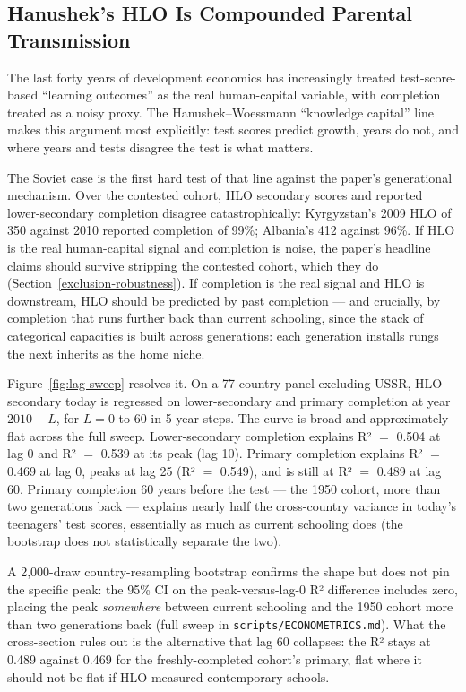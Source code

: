 \documentclass[12pt,letterpaper]{article}
\begin{document}
\subsection{Hanushek's HLO Is Compounded Parental Transmission}\label{hanushek-reconciliation}

The last forty years of development economics has increasingly
treated test-score-based ``learning outcomes'' as the real
human-capital variable, with completion treated as a noisy proxy.
The Hanushek--Woessmann ``knowledge capital'' line makes this
argument most explicitly: test scores predict growth, years do not,
and where years and tests disagree the test is what matters.

The Soviet case is the first hard test of that line against the
paper's generational mechanism. Over the contested cohort, HLO
secondary scores and reported lower-secondary completion disagree
catastrophically: Kyrgyzstan's 2009 HLO of 350 against 2010 reported
completion of 99\%; Albania's 412 against 96\%. If HLO is the real
human-capital signal and completion is noise, the paper's headline
claims should survive stripping the contested cohort, which they do
(Section~\ref{exclusion-robustness}). If completion is the real
signal and HLO is downstream, HLO should be predicted by past
completion --- and crucially, by completion that runs further back
than current schooling, since the stack of categorical capacities
is built across generations: each generation installs rungs the
next inherits as the home niche.

Figure~\ref{fig:lag-sweep} resolves it. On a 77-country panel
excluding USSR, HLO secondary today is regressed on lower-secondary
and primary completion at year $2010 - L$, for $L = 0$ to $60$ in
5-year steps. The curve is broad and approximately flat across the
full sweep. Lower-secondary completion explains R² $=$ 0.504 at lag
0 and R² $=$ 0.539 at its peak (lag 10). Primary completion explains
R² $=$ 0.469 at lag 0, peaks at lag 25 (R² $=$ 0.549), and is still
at R² $=$ 0.489 at lag 60. Primary completion 60 years before the
test --- the 1950 cohort, more than two generations back --- explains
nearly half the cross-country variance
in today's teenagers' test scores, essentially as much as current
schooling does (the bootstrap does not statistically separate the two).

A 2,000-draw country-resampling bootstrap confirms the shape but does
not pin the specific peak: the 95\% CI on the peak-versus-lag-0 R²
difference includes zero, placing the peak \emph{somewhere} between
current schooling and the 1950 cohort more than two generations back
(full sweep in \texttt{scripts/ECONOMETRICS.md}). What the
cross-section rules out is the alternative that lag 60 collapses: the
R² stays at 0.489 against 0.469 for the freshly-completed cohort's
primary, flat where it should not be flat if HLO measured contemporary
schools.
\end{document}
